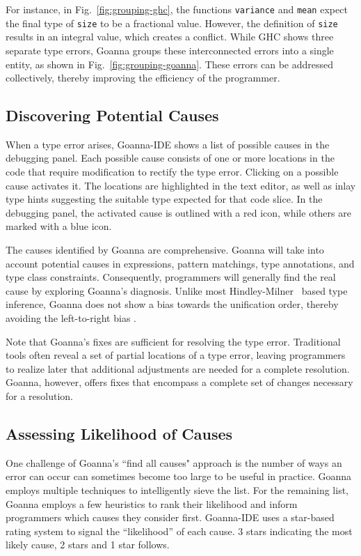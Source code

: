     For instance, in Fig.~\ref{fig:grouping-ghc}, the functions \texttt{variance} and \texttt{mean} expect the final type of \texttt{size} to be a fractional value. However, the definition of \texttt{size} results in an integral value, which creates a conflict. While GHC shows three separate type errors, Goanna groups these interconnected errors into a single entity, as shown in Fig.~\ref{fig:grouping-goanna}. These errors can be addressed collectively, thereby improving the efficiency of the programmer.

    \subsection{Discovering Potential Causes} \label{sub:suggesting}
    When a type error arises, Goanna-IDE shows a list of possible causes in the debugging panel. Each possible cause consists of one or more locations in the code that require modification to rectify the type error. Clicking on a possible cause activates it. The locations are highlighted in the text editor, as well as inlay type hints suggesting the suitable type expected for that code slice. In the debugging panel, the activated cause is outlined with a red icon, while others are marked with a blue icon. 

    The causes identified by Goanna are comprehensive. Goanna will take into account potential causes in expressions, pattern matchings, type annotations, and type class constraints. Consequently, programmers will generally find the real cause by exploring Goanna's diagnosis. Unlike most Hindley-Milner~\cite{Damas1982-sc} based type inference, Goanna does not show a bias towards the unification order, thereby avoiding the left-to-right bias \cite{Chen2014-ev}. 
    
    Note that Goanna's fixes are sufficient for resolving the type error. Traditional tools often reveal a set of partial locations of a type error, leaving programmers to realize later that additional adjustments are needed for a complete resolution. Goanna, however, offers fixes that encompass a complete set of changes necessary for a resolution.


    \subsection{Assessing Likelihood of Causes} \label{sub:conciseness}
    One challenge of Goanna's ``find all causes" approach is the number of ways an error can occur can sometimes become too large to be useful in practice. Goanna employs multiple techniques to intelligently sieve the list. For the remaining list, Goanna employs a few heuristics to rank their likelihood and inform programmers which causes they consider first. 
    Goanna-IDE uses a star-based rating system to signal the ``likelihood'' of each cause. 3 stars indicating the most likely cause, 2 stars and 1 star follows. 

